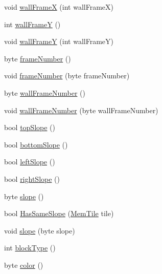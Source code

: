 \begin{DoxyCompactItemize}
\item 
void \hyperlink{class_o_t_a_1_1_memory_1_1_mem_tile_aa410f26bc19d0c79058b9f51ff8e05f8}{wall\+Frame\+X} (int wall\+Frame\+X)
\item 
int \hyperlink{class_o_t_a_1_1_memory_1_1_mem_tile_a6940a8c3abc445ec69a4874242c68a99}{wall\+Frame\+Y} ()
\item 
void \hyperlink{class_o_t_a_1_1_memory_1_1_mem_tile_aa5c463f393d57cb8f39ace72c09b7cbd}{wall\+Frame\+Y} (int wall\+Frame\+Y)
\item 
byte \hyperlink{class_o_t_a_1_1_memory_1_1_mem_tile_adc9fcd121691643fb98ae487bf4c107c}{frame\+Number} ()
\item 
void \hyperlink{class_o_t_a_1_1_memory_1_1_mem_tile_a3e15ef5056c6583e1335dca9fb46b9a6}{frame\+Number} (byte frame\+Number)
\item 
byte \hyperlink{class_o_t_a_1_1_memory_1_1_mem_tile_a8b4522027eed0b6333b4065d25ac6e95}{wall\+Frame\+Number} ()
\item 
void \hyperlink{class_o_t_a_1_1_memory_1_1_mem_tile_a6d355f0a79e2f0bc1cb1b5275fc41780}{wall\+Frame\+Number} (byte wall\+Frame\+Number)
\item 
bool \hyperlink{class_o_t_a_1_1_memory_1_1_mem_tile_ab8fcf46a36c6a528273a0dbc9d1187af}{top\+Slope} ()
\item 
bool \hyperlink{class_o_t_a_1_1_memory_1_1_mem_tile_a3a138e2f48dc8e25397808d96dbe1954}{bottom\+Slope} ()
\item 
bool \hyperlink{class_o_t_a_1_1_memory_1_1_mem_tile_ae30d4b8d1cbcd3aad5ff4effee491a33}{left\+Slope} ()
\item 
bool \hyperlink{class_o_t_a_1_1_memory_1_1_mem_tile_a334185d6cac40d9f70a906a6dfbcd81d}{right\+Slope} ()
\item 
byte \hyperlink{class_o_t_a_1_1_memory_1_1_mem_tile_a8bb42aeb3a3f0b03e3980351ecfebf01}{slope} ()
\item 
bool \hyperlink{class_o_t_a_1_1_memory_1_1_mem_tile_aecd90af5cef7579268b3a9c0684e4012}{Has\+Same\+Slope} (\hyperlink{class_o_t_a_1_1_memory_1_1_mem_tile}{Mem\+Tile} tile)
\item 
void \hyperlink{class_o_t_a_1_1_memory_1_1_mem_tile_a932719714fbd4b242187b0a5cc8c892e}{slope} (byte slope)
\item 
int \hyperlink{class_o_t_a_1_1_memory_1_1_mem_tile_a38fe4ba8bbbbd4cb919f4f4f1a9c28e9}{block\+Type} ()
\item 
byte \hyperlink{class_o_t_a_1_1_memory_1_1_mem_tile_a84813f405075c4d16203066de17cf3fd}{color} ()
\item 

\end{DoxyCompactItemize}
